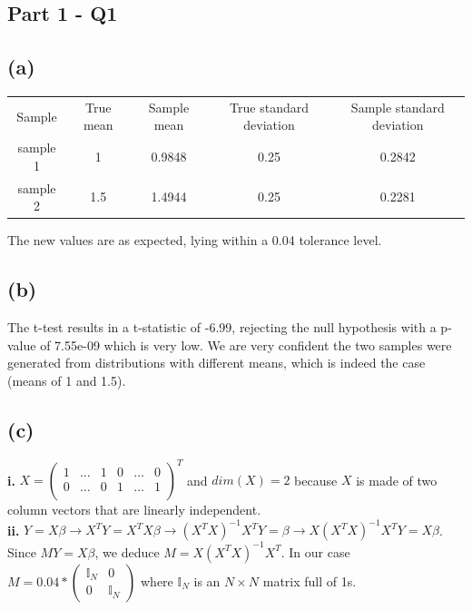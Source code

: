 \documentclass[12pt,a4paper,oneside]{report}
\begin{document}

\subsection*{Part 1 - Q1}
\subsection*{(a)}

\begin{center}
\begin{tabular}{c | c | c | c | c}
Sample & True mean & Sample mean & True standard deviation & Sample standard deviation\\
sample 1 & 1 & 0.9848 & 0.25 & 0.2842\\
sample 2 & 1.5 & 1.4944 & 0.25 & 0.2281\\
\end{tabular}
\end{center}

The new values are as expected, lying within a 0.04 tolerance level.

\subsection*{(b)}

The t-test results in a t-statistic of -6.99, rejecting the null hypothesis with a p-value of 7.55e-09 which is very low. We are very confident the two samples were generated from distributions with different means, which is indeed the case (means of 1 and 1.5).

\subsection*{(c)}

\textbf{i.} $X = \begin{pmatrix}
1 & \dots & 1 & 0 & \dots & 0\\
0 & \dots & 0 & 1 & \dots & 1\\

\end{pmatrix}^T$ and $dim(X) = 2$ because $X$ is made of two column vectors that are linearly independent.\\


\textbf{ii.} $Y = X\beta \to X^TY = X^TX\beta \to (X^TX)^{-1}X^TY = \beta \to X(X^TX)^{-1}X^TY = X\beta$. Since $MY = X\beta$, we deduce $M = X(X^TX)^{-1}X^T$. In our case $M = 
0.04 * \begin{pmatrix}
\mathbb{I}_N & 0\\
0 & \mathbb{I}_N
\end{pmatrix}
$
where $\mathbb{I}_N$ is an $N \times N$ matrix full of 1s.\\
                 
\end{document}
